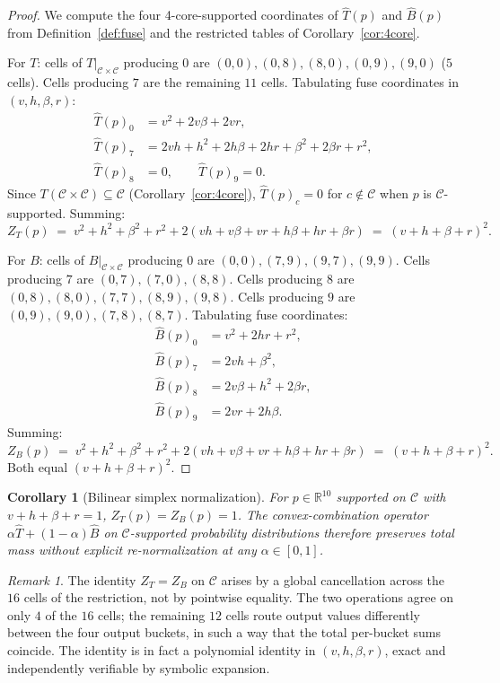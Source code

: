 \documentclass[11pt,reqno]{amsart}
\theoremstyle{plain}
\newtheorem{corollary}[theorem]{Corollary}
\theoremstyle{definition}
\theoremstyle{remark}
\newtheorem*{remark}{Remark}
\newcommand{\R}{\mathbb{R}}
\newcommand{\Cfour}{\mathcal{C}}
\begin{document}
\begin{proof}
We compute the four 4-core-supported coordinates of
$\widehat{T}(p)$ and $\widehat{B}(p)$ from
Definition~\ref{def:fuse} and the restricted tables of
Corollary~\ref{cor:4core}.

For $T$: cells of $T\big|_{\Cfour\times\Cfour}$ producing $0$ are
$(0,0),(0,8),(8,0),(0,9),(9,0)$ ($5$ cells). Cells producing $7$
are the remaining $11$ cells. Tabulating fuse coordinates in
$(v,h,\beta,r)$:
\begin{align*}
\widehat{T}(p)_{0}&=v^{2}+2v\beta+2vr,\\
\widehat{T}(p)_{7}&=2vh+h^{2}+2h\beta+2hr+\beta^{2}+2\beta r+r^{2},\\
\widehat{T}(p)_{8}&=0,\qquad\widehat{T}(p)_{9}=0.
\end{align*}
Since $T(\Cfour\times\Cfour)\subseteq\Cfour$
(Corollary~\ref{cor:4core}), $\widehat{T}(p)_{c}=0$ for
$c\notin\Cfour$ when $p$ is $\Cfour$-supported. Summing:
\[
Z_{T}(p)\;=\;v^{2}+h^{2}+\beta^{2}+r^{2}+2(vh+v\beta+vr+h\beta+hr+\beta r)\;=\;(v+h+\beta+r)^{2}.
\]

For $B$: cells of $B\big|_{\Cfour\times\Cfour}$ producing $0$ are
$(0,0),(7,9),(9,7),(9,9)$. Cells producing $7$ are
$(0,7),(7,0),(8,8)$. Cells producing $8$ are
$(0,8),(8,0),(7,7),(8,9),(9,8)$. Cells producing $9$ are
$(0,9),(9,0),(7,8),(8,7)$. Tabulating fuse coordinates:
\begin{align*}
\widehat{B}(p)_{0}&=v^{2}+2hr+r^{2},\\
\widehat{B}(p)_{7}&=2vh+\beta^{2},\\
\widehat{B}(p)_{8}&=2v\beta+h^{2}+2\beta r,\\
\widehat{B}(p)_{9}&=2vr+2h\beta.
\end{align*}
Summing:
\[
Z_{B}(p)\;=\;v^{2}+h^{2}+\beta^{2}+r^{2}+2(vh+v\beta+vr+h\beta+hr+\beta r)\;=\;(v+h+\beta+r)^{2}.
\]
Both equal $(v+h+\beta+r)^{2}$.
\end{proof}

\begin{corollary}[Bilinear simplex normalization]\label{cor:Z=1}
For $p\in\R^{10}$ supported on $\Cfour$ with
$v+h+\beta+r=1$, $Z_{T}(p)=Z_{B}(p)=1$. The convex-combination
operator $\alpha\widehat{T}+(1-\alpha)\widehat{B}$ on
$\Cfour$-supported probability distributions therefore preserves
total mass without explicit re-normalization at any
$\alpha\in[0,1]$.
\end{corollary}

\begin{remark}
The identity $Z_{T}=Z_{B}$ on $\Cfour$ arises by a global
cancellation across the $16$ cells of the restriction, not by
pointwise equality. The two operations agree on only $4$ of the
$16$ cells; the remaining $12$ cells route output values
differently between the four output buckets, in such a way that
the total per-bucket sums coincide. The identity is in fact a
polynomial identity in $(v,h,\beta,r)$, exact and independently
verifiable by symbolic expansion.
\end{remark}
\end{document}
